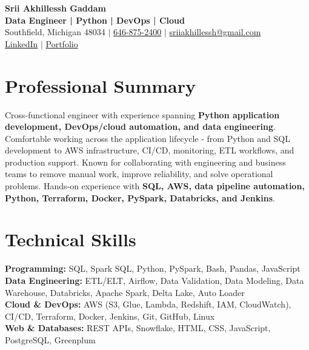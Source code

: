 \documentclass[letterpaper,10pt]{article}
\begin{document}
\fontsize{9.35pt}{10.45pt}\selectfont

\begin{center}
    {\LARGE \textbf{Srii Akhillessh Gaddam}} \\[-1pt]
    \textbf{Data Engineer | Python | DevOps | Cloud} \\[2pt]
    Southfield, Michigan 48034 $|$
    \href{tel:6468752400}{646-875-2400} $|$
    \href{mailto:sriiakhillessh@gmail.com}{sriiakhillessh@gmail.com} \\[1pt]
    \href{https://www.linkedin.com/in/srii-akhiilessh-gaddam-b48668191/}{LinkedIn} $|$
    \href{https://sriiakhillesshg.github.io/portfolio/}{Portfolio}
\end{center}
\vspace{-8pt}

\section{Professional Summary}
\small{Cross-functional engineer with experience spanning \textbf{Python application development, DevOps/cloud automation, and data engineering}. Comfortable working across the application lifecycle - from Python and SQL development to AWS infrastructure, CI/CD, monitoring, ETL workflows, and production support. Known for collaborating with engineering and business teams to remove manual work, improve reliability, and solve operational problems. Hands-on experience with \textbf{SQL, AWS, data pipeline automation, Python, Terraform, Docker, PySpark, Databricks, and Jenkins}.}

\section{Technical Skills}
\small{
\textbf{Programming:} SQL, Spark SQL, Python, PySpark, Bash, Pandas, JavaScript \\
\textbf{Data Engineering:} ETL/ELT, Airflow, Data Validation, Data Modeling, Data Warehouse, Databricks, Apache Spark, Delta Lake, Auto Loader \\
\textbf{Cloud \& DevOps:} AWS (S3, Glue, Lambda, Redshift, IAM, CloudWatch), CI/CD, Terraform, Docker, Jenkins, Git, GitHub, Linux \\
\textbf{Web \& Databases:} REST APIs, Snowflake, HTML, CSS, JavaScript, PostgreSQL, Greenplum
}
\end{document}
